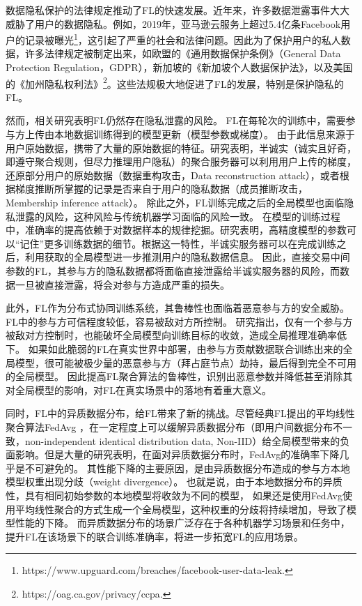 数据隐私保护的法律规定推动了FL的快速发展。近年来，许多数据泄露事件大大威胁了用户的数据隐私。例如，2019年，亚马逊云服务上超过5.4亿条Facebook用户的记录被曝光\footnote{https://www.upguard.com/breaches/facebook-user-data-leak.}，这引起了严重的社会和法律问题。因此为了保护用户的私人数据，许多法律规定被制定出来，如欧盟的《通用数据保护条例》（General Data Protection Regulation，GDPR）\cite{voigt2017eu}，新加坡的《新加坡个人数据保护法》\cite{chik2013singapore}，以及美国的《加州隐私权利法》\footnote{https://oag.ca.gov/privacy/ccpa.}。这些法规极大地促进了FL的发展，特别是保护隐私的FL。

然而，相关研究\cite{geiping2020inverting, zhu2019deep}表明FL仍然存在隐私泄露的风险。
FL在每轮次的训练中，需要参与方上传由本地数据训练得到的模型更新（模型参数或梯度）。
由于此信息来源于用户原始数据，携带了大量的原始数据的特征。研究\cite{zhu2019deep}表明，半诚实（诚实且好奇，即遵守聚合规则，但尽力推理用户隐私）的聚合服务器可以利用用户上传的梯度，还原部分用户的原始数据（数据重构攻击，Data reconstruction attack），或者根据梯度推断所掌握的记录是否来自于用户的隐私数据（成员推断攻击，Membership inference attack）。
除此之外，FL训练完成之后的全局模型也面临隐私泄露的风险，这种风险与传统机器学习面临的风险一致。
在模型的训练过程中，准确率的提高依赖于对数据样本的规律挖掘。研究\cite{song2017machine}表明，高精度模型的参数可以“记住”更多训练数据的细节。根据这一特性，半诚实服务器可以在完成训练之后，利用获取的全局模型进一步推测用户的隐私数据信息。
因此，直接交易中间参数的FL，其参与方的隐私数据都将面临直接泄露给半诚实服务器的风险，而数据一旦被直接泄露，将会对参与方造成严重的损失。

此外，FL作为分布式协同训练系统，其鲁棒性也面临着恶意参与方的安全威胁。
FL中的参与方可信程度较低，容易被敌对方所控制。
研究\cite{blanchard2017machine}指出，仅有一个参与方被敌对方控制时，也能破坏全局模型向训练目标的收敛，造成全局推理准确率低下。
如果如此脆弱的FL在真实世界中部署，由参与方贡献数据联合训练出来的全局模型，很可能被极少量的恶意参与方（拜占庭节点）劫持，最后得到完全不可用的全局模型。
因此提高FL聚合算法的鲁棒性，识别出恶意参数并降低甚至消除其对全局模型的影响，对FL在真实场景中的落地有着重大意义。

同时，FL中的异质数据分布，给FL带来了新的挑战。尽管经典FL提出的平均线性聚合算法FedAvg \cite{mcmahan2017communication}，在一定程度上可以缓解异质数据分布（即用户间数据分布不一致，non-independent identical distribution data, Non-IID）给全局模型带来的负面影响。但是大量的研究\cite{zhao2018federated}表明，在面对异质数据分布时，FedAvg的准确率下降几乎是不可避免的。
其性能下降的主要原因，是由异质数据分布造成的参与方本地模型权重出现分歧（weight divergence）。
也就是说，由于本地数据分布的异质性，具有相同初始参数的本地模型将收敛为不同的模型，
如果还是使用FedAvg使用平均线性聚合的方式生成一个全局模型，这种权重的分歧将持续增加，导致了模型性能的下降。
而异质数据分布的场景广泛存在于各种机器学习场景和任务中，提升FL在该场景下的联合训练准确率，将进一步拓宽FL的应用场景。


